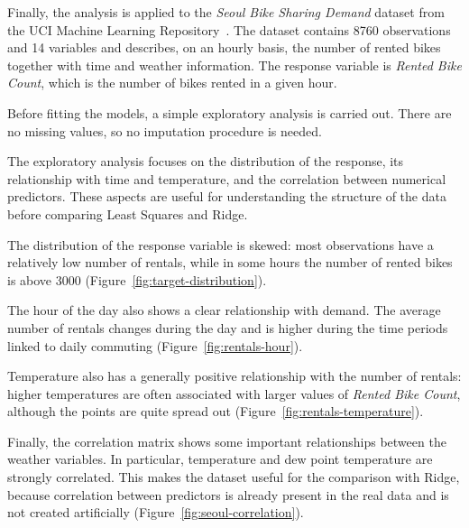 \documentclass[11pt,a4paper]{article}
\begin{document}
Finally, the analysis is applied to the \emph{Seoul Bike Sharing Demand} dataset from the UCI Machine Learning Repository~\cite{uci2020seoul}. The dataset contains 8760 observations and 14 variables and describes, on an hourly basis, the number of rented bikes together with time and weather information. The response variable is \emph{Rented Bike Count}, which is the number of bikes rented in a given hour.

Before fitting the models, a simple exploratory analysis is carried out. There are no missing values, so no imputation procedure is needed.

The exploratory analysis focuses on the distribution of the response, its relationship with time and temperature, and the correlation between numerical predictors. These aspects are useful for understanding the structure of the data before comparing Least Squares and Ridge.

The distribution of the response variable is skewed: most observations have a relatively low number of rentals, while in some hours the number of rented bikes is above 3000 (Figure~\ref{fig:target-distribution}).

The hour of the day also shows a clear relationship with demand. The average number of rentals changes during the day and is higher during the time periods linked to daily commuting (Figure~\ref{fig:rentals-hour}).

Temperature also has a generally positive relationship with the number of rentals: higher temperatures are often associated with larger values of \emph{Rented Bike Count}, although the points are quite spread out (Figure~\ref{fig:rentals-temperature}).

Finally, the correlation matrix shows some important relationships between the weather variables. In particular, temperature and dew point temperature are strongly correlated. This makes the dataset useful for the comparison with Ridge, because correlation between predictors is already present in the real data and is not created artificially (Figure~\ref{fig:seoul-correlation}).
\end{document}
